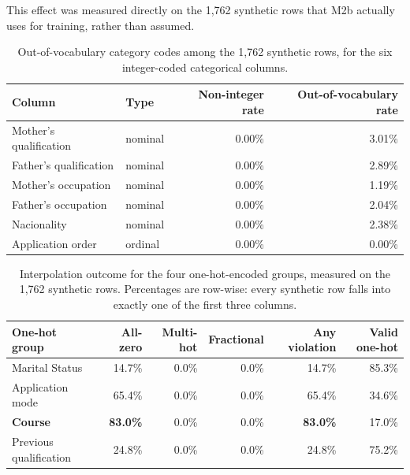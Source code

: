This effect was measured directly on the 1{,}762 synthetic rows that M2b actually
uses for training, rather than assumed.

\begin{table}[H]
\centering
\caption{Out-of-vocabulary category codes among the 1{,}762 synthetic rows, for
the six integer-coded categorical columns.}
\label{tab:f2-code-audit}
\begin{tabular}{llrr}
\toprule
\textbf{Column} & \textbf{Type} & \textbf{Non-integer rate} & \textbf{Out-of-vocabulary rate} \\
\midrule
Mother's qualification & nominal & 0.00\% & 3.01\% \\
Father's qualification & nominal & 0.00\% & 2.89\% \\
Mother's occupation     & nominal & 0.00\% & 1.19\% \\
Father's occupation     & nominal & 0.00\% & 2.04\% \\
Nacionality              & nominal & 0.00\% & 2.38\% \\
Application order        & ordinal & 0.00\% & 0.00\% \\
\bottomrule
\end{tabular}
\end{table}

\vspace{0.3cm}

\begin{table}[H]
\centering\small
\caption{Interpolation outcome for the four one-hot-encoded groups, measured on
the 1{,}762 synthetic rows. Percentages are row-wise: every synthetic row falls
into exactly one of the first three columns.}
\label{tab:f2-onehot-audit}
\begin{tabular}{lrrrrr}
\toprule
\textbf{One-hot group} & \textbf{All-zero} & \textbf{Multi-hot} & \textbf{Fractional} & \textbf{Any violation} & \textbf{Valid one-hot} \\
\midrule
Marital Status          & 14.7\% & 0.0\% & 0.0\% & 14.7\% & 85.3\% \\
Application mode        & 65.4\% & 0.0\% & 0.0\% & 65.4\% & 34.6\% \\
\textbf{Course}          & \textbf{83.0\%} & 0.0\% & 0.0\% & \textbf{83.0\%} & 17.0\% \\
Previous qualification  & 24.8\% & 0.0\% & 0.0\% & 24.8\% & 75.2\% \\
\bottomrule
\end{tabular}
\end{table}

